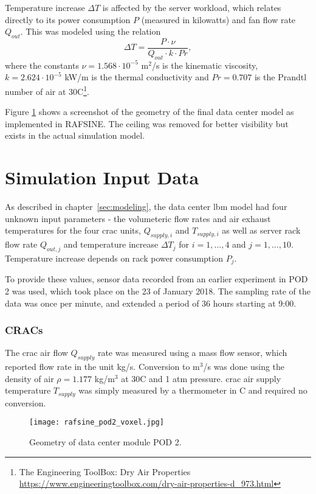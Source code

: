 Temperature increase $\Delta T$ is affected by the server workload, which relates directly to its power consumption $P$ (measured in kilowatts) and fan flow rate $Q_{out}$. This was modeled using the relation~\cites[pg.167]{Delbosc}
\begin{equation}
\Delta T = \frac{P \cdot \nu}{Q_{out} \cdot k \cdot Pr},
\end{equation}
where the constants $\nu = 1.568\cdot10^{-5}$ m$^2$/s is the kinematic viscosity, $k=2.624\cdot10^{-5}$ kW/m is the thermal conductivity and $Pr = 0.707$ is the Prandtl number of air at 30\degree C\footnote{The Engineering ToolBox: Dry Air Properties \url{https://www.engineeringtoolbox.com/dry-air-properties-d_973.html} }.

Figure \ref{fig:pod2_voxel} shows a screenshot of the geometry of the final data center model as implemented in RAFSINE. The ceiling was removed for better visibility but exists in the actual simulation model.


\section{Simulation Input Data}
As described in chapter~\ref{sec:modeling}, the data center \gls{lbm} model had four unknown input parameters - the volumeteric flow rates and air exhaust temperatures for the four \gls{crac} units, $Q_{supply,i}$ and $T_{supply,i}$ as well as server rack flow rate $Q_{out,j}$ and temperature increase $\Delta T_j$ for $i=1,\dots, 4$ and $j=1,\dots, 10$. Temperature increase depends on rack power consumption $P_j$.

To provide these values, sensor data recorded from an earlier experiment in POD 2 was used, which took place on the 23 of January 2018. The sampling rate of the data was once per minute, and extended a period of 36 hours starting at 9:00.

\clearpage
\subsubsection{CRACs}
The \gls{crac} air flow $Q_{supply}$ rate was measured using a mass flow sensor, which reported flow rate in the unit kg/s. Conversion to m$^3$/s was done using the density of air $\rho=1.177$ kg/m$^3$ at 30\degree C and 1 atm pressure\footnotemark[\value{footnote}]. \gls{crac} air supply temperature $T_{supply}$ was simply measured by a thermometer in \degree C and required no conversion.
\begin{figure}[ht]
\begin{center}
\texttt{[image: rafsine\_pod2\_voxel.jpg]}
\end{center}
\caption{Geometry of data center module POD 2.}
\label{fig:pod2_voxel}
\end{figure}

